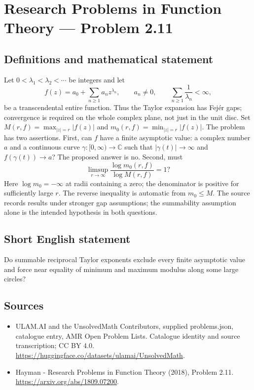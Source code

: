 \documentclass[11pt,a4paper]{article}
\begin{document}
\section*{Research Problems in Function Theory — Problem 2.11}\label{statement}

\subsection{Definitions and mathematical statement}
Let $0<\lambda_1<\lambda_2<\cdots$ be integers and let
\[
f(z)=a_0+\sum_{n\ge1}a_nz^{\lambda_n},\qquad a_n\ne0,
\qquad \sum_{n\ge1}\frac1{\lambda_n}<\infty,
\]
be a transcendental entire function. Thus the Taylor expansion has Fej\'er gaps; convergence is required on the whole complex plane, not just in the unit disc. Set
$M(r,f)=\max_{|z|=r}|f(z)|$ and $m_0(r,f)=\min_{|z|=r}|f(z)|$.
The problem has two assertions. First, can $f$ have a finite asymptotic value: a complex number $a$ and a continuous curve $\gamma:[0,\infty)\to\mathbb C$ such that $|\gamma(t)|\to\infty$ and $f(\gamma(t))\to a$? The proposed answer is no. Second, must
\[
\limsup_{r\to\infty}\frac{\log m_0(r,f)}{\log M(r,f)}=1?
\]
Here $\log m_0=-\infty$ at radii containing a zero; the denominator is positive for sufficiently large $r$. The reverse inequality is automatic from $m_0\le M$. The source records results under stronger gap assumptions; the summability assumption alone is the intended hypothesis in both questions.
\subsection{Short English statement}
Do summable reciprocal Taylor exponents exclude every finite asymptotic value and force near equality of minimum and maximum modulus along some large circles?
\subsection{Sources}
\begin{itemize}
\item[S1] ULAM.AI and the UnsolvedMath Contributors, supplied problems.json, catalogue entry, AMR Open Problem Lists. Catalogue identity and source transcription; CC BY 4.0.
\url{https://huggingface.co/datasets/ulamai/UnsolvedMath}.
\item[S2] Hayman - Research Problems in Function Theory (2018), Problem 2.11. 
\url{https://arxiv.org/abs/1809.07200}.
\end{itemize}
\end{document}
